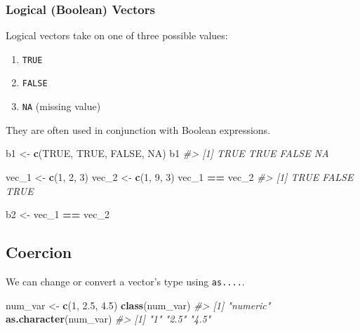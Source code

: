 \documentclass[]{book}
\newenvironment{Shaded}{\begin{snugshade}}{\end{snugshade}}
\newcommand{\KeywordTok}[1]{\textcolor[rgb]{0.13,0.29,0.53}{\textbf{#1}}}
\newcommand{\DecValTok}[1]{\textcolor[rgb]{0.00,0.00,0.81}{#1}}
\newcommand{\FloatTok}[1]{\textcolor[rgb]{0.00,0.00,0.81}{#1}}
\newcommand{\StringTok}[1]{\textcolor[rgb]{0.31,0.60,0.02}{#1}}
\newcommand{\CommentTok}[1]{\textcolor[rgb]{0.56,0.35,0.01}{\textit{#1}}}
\newcommand{\OtherTok}[1]{\textcolor[rgb]{0.56,0.35,0.01}{#1}}
\newcommand{\OperatorTok}[1]{\textcolor[rgb]{0.81,0.36,0.00}{\textbf{#1}}}
\newcommand{\NormalTok}[1]{#1}
\providecommand{\tightlist}{%
  \setlength{\itemsep}{0pt}\setlength{\parskip}{0pt}}
\begin{document}
\subsubsection*{Logical (Boolean)
Vectors}\label{logical-boolean-vectors}

Logical vectors take on one of three possible values:

\begin{enumerate}
\def\labelenumi{\arabic{enumi}.}
\tightlist
\item
  \texttt{TRUE}
\item
  \texttt{FALSE}
\item
  \texttt{NA} (missing value)
\end{enumerate}

They are often used in conjunction with Boolean expressions.

\begin{Shaded}
\begin{Highlighting}[]
\NormalTok{b1 <-}\StringTok{ }\KeywordTok{c}\NormalTok{(}\OtherTok{TRUE}\NormalTok{, }\OtherTok{TRUE}\NormalTok{, }\OtherTok{FALSE}\NormalTok{, }\OtherTok{NA}\NormalTok{)}
\NormalTok{b1}
\CommentTok{#> [1]  TRUE  TRUE FALSE    NA}

\NormalTok{vec_}\DecValTok{1}\NormalTok{ <-}\StringTok{ }\KeywordTok{c}\NormalTok{(}\DecValTok{1}\NormalTok{, }\DecValTok{2}\NormalTok{, }\DecValTok{3}\NormalTok{)}
\NormalTok{vec_}\DecValTok{2}\NormalTok{ <-}\StringTok{ }\KeywordTok{c}\NormalTok{(}\DecValTok{1}\NormalTok{, }\DecValTok{9}\NormalTok{, }\DecValTok{3}\NormalTok{)}
\NormalTok{vec_}\DecValTok{1} \OperatorTok{==}\StringTok{ }\NormalTok{vec_}\DecValTok{2}
\CommentTok{#> [1]  TRUE FALSE  TRUE}

\NormalTok{b2 <-}\StringTok{ }\NormalTok{vec_}\DecValTok{1} \OperatorTok{==}\StringTok{ }\NormalTok{vec_}\DecValTok{2}
\end{Highlighting}
\end{Shaded}

\subsection{Coercion}\label{coercion-1}

We can change or convert a vector's type using \texttt{as....}.

\begin{Shaded}
\begin{Highlighting}[]
\NormalTok{num_var <-}\StringTok{ }\KeywordTok{c}\NormalTok{(}\DecValTok{1}\NormalTok{, }\FloatTok{2.5}\NormalTok{, }\FloatTok{4.5}\NormalTok{)}
\KeywordTok{class}\NormalTok{(num_var)}
\CommentTok{#> [1] "numeric"}
\KeywordTok{as.character}\NormalTok{(num_var)}
\CommentTok{#> [1] "1"   "2.5" "4.5"}
\end{Highlighting}
\end{Shaded}
\end{document}
